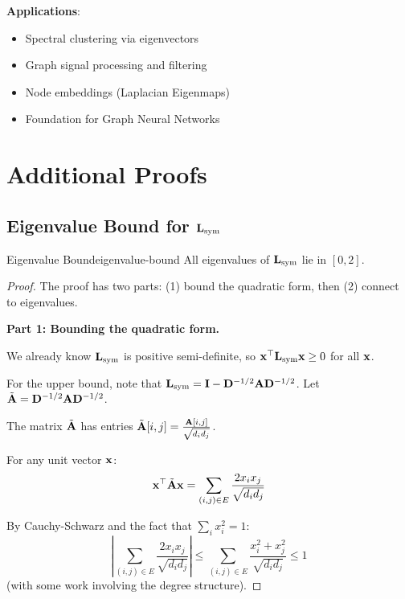 \begin{notechapter}
\begin{keyidea}
\textbf{Applications}:
\begin{itemize}
    \item Spectral clustering via eigenvectors
    \item Graph signal processing and filtering
    \item Node embeddings (Laplacian Eigenmaps)
    \item Foundation for Graph Neural Networks
\end{itemize}
\end{keyidea}

\chapterappendix
\section{Additional Proofs}

\subsection{Eigenvalue Bound for $\mathbf{L}_{\text{sym}}$}
\label{graph-laplacians:app:eigenvalue-bound}

\begin{proposition}{Eigenvalue Bound}{eigenvalue-bound}
All eigenvalues of $\mathbf{L}_{\text{sym}}$ lie in $[0, 2]$.
\end{proposition}

\begin{proof}
The proof has two parts: (1) bound the quadratic form, then (2) connect to eigenvalues.

\textbf{Part 1: Bounding the quadratic form.}

We already know $\mathbf{L}_{\text{sym}}$ is positive semi-definite, so $\mathbf{x}^\top \mathbf{L}_{\text{sym}} \mathbf{x} \geq 0$ for all $\mathbf{x}$.

For the upper bound, note that $\mathbf{L}_{\text{sym}} = \mathbf{I} - \mathbf{D}^{-1/2}\mathbf{A}\mathbf{D}^{-1/2}$. Let $\tilde{\mathbf{A}} = \mathbf{D}^{-1/2}\mathbf{A}\mathbf{D}^{-1/2}$.

The matrix $\tilde{\mathbf{A}}$ has entries $\tilde{\mathbf{A}}[i,j] = \frac{\mathbf{A}[i,j]}{\sqrt{d_i d_j}}$.

For any unit vector $\mathbf{x}$:
\[
\mathbf{x}^\top \tilde{\mathbf{A}} \mathbf{x} = \sum_{(i,j) \in E} \frac{2 x_i x_j}{\sqrt{d_i d_j}}
\]

By Cauchy-Schwarz and the fact that $\sum_i x_i^2 = 1$:
\[
\left| \sum_{(i,j) \in E} \frac{2 x_i x_j}{\sqrt{d_i d_j}} \right| \leq \sum_{(i,j) \in E} \frac{x_i^2 + x_j^2}{\sqrt{d_i d_j}} \leq 1
\]
(with some work involving the degree structure).


\end{proof}
\end{notechapter}
